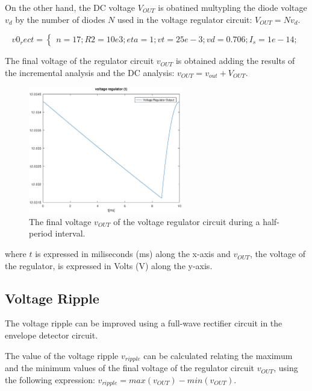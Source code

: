 On the other hand, the DC voltage $V_{OUT}$ is obatined multypling the diode voltage $v_d$ by the number of diodes $N$ used in the voltage regulator circuit: $V_{OUT}=N v_d$.

\[
v0_rect =
\left\{\begin{matrix}
n=17;
R2=10e3;
eta=1;
vt=25e-3;
vd=0.706;
I_s=1e-14;
\end{matrix}\right.
\]

The final voltage of the regulator circuit $v_{OUT}$ is obtained adding the results of the incremental analysis and the DC analysis: $v_{OUT}=v_{out}+V_{OUT}$.

\begin{figure}[H] \centering
\includegraphics[width=0.6\textwidth]{output.eps}
\caption{The final voltage $v_{OUT}$ of the voltage regulator circuit during a half-period interval.}
\label{fig:output}
\end{figure}

where $t$ is expressed in miliseconds (ms) along the x-axis and 
$v_{OUT}$, the voltage of the regulator, is expressed in Volts (V) along the y-axis.

\subsection{Voltage Ripple}
\label{subsec:ripple}

The voltage ripple can be improved using a full-wave rectifier circuit in the envelope detector circuit. 

The value of the voltage ripple $v_{ripple}$ can be calculated relating the maximum and the minimum values of the final voltage of the regulator circuit $v_{OUT}$, using the following expression: $v_{ripple}=max(v_{OUT})-min(v_{OUT})$.


